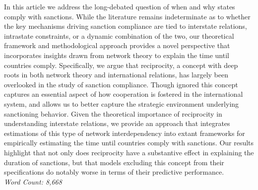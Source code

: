 In this article we address the long-debated question of when and why states comply with sanctions. While the literature remains indeterminate as to whether the key mechanisms driving sanction compliance are tied to interstate relations, intrastate constraints, or a dynamic combination of the two, our theoretical framework and methodological approach provides a novel perspective that incorporates insights drawn from network theory to explain the time until countries comply. Specifically, we argue that reciprocity, a concept with deep roots in both network theory and international relations, has largely been overlooked in the study of sanction compliance. Though ignored this concept captures an essential aspect of how cooperation is fostered in the international system, and allows us to better capture the strategic environment underlying sanctioning behavior. Given the theoretical importance of reciprocity in understanding interstate relations, we provide an approach that integrates estimations of this type of network interdependency into extant frameworks for empirically estimating the time until countries comply with sanctions. Our results highlight that not only does reciprocity have a substantive effect in explaining the duration of sanctions, but that models excluding this concept from their specifications do notably worse in terms of their predictive performance.\\

\noindent \textit{Word Count: 8,668}

